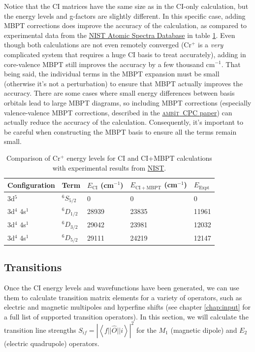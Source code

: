 \documentclass{report}
\newcommand{\ambit}{\textsc{amb}{\footnotesize i}\textsc{t}}
\begin{document}
Notice that the CI matrices have the same size as in the CI-only calculation, but the energy levels and
g-factors are slightly different. In this specific case, adding MBPT corrections does improve the
accuracy of the calculation, as compared to experimental data from the 
\href{https://physics.nist.gov/PhysRefData/ASD/levels_form.html}{NIST Atomic Spectra Database} in table
\ref{tab:CI_MBPT_comparison}. Even though both calculations are not even remotely converged (Cr$^+$ is a
\emph{very} complicated system that requires a huge CI basis to treat accurately), adding in
core-valence MBPT still improves the accuracy by a few thousand cm$^{-1}$. That being said, the
individual terms in the MBPT expansion must be small (otherwise it's not a perturbation) to ensure that
MBPT actually improves the accuracy. There are some cases where small energy differences between
basis orbitals lead to large MBPT diagrams, so including MBPT corrections (especially
valence-valence MBPT corrections, described in the \href{link_goes_here}{\ambit\  CPC paper}) can
actually reduce the accuracy of the calculation. Consequently, it's important to be careful when 
constructing the MBPT basis to ensure all the terms remain small.

\begin{table}
\label{tab:CI_MBPT_comparison}
\caption{Comparison of Cr$^+$ energy levels for CI and CI+MBPT calculations with experimental results
from \href{https://physics.nist.gov/PhysRefData/ASD/levels_form.html}{NIST}.}
\begin{tabular}{l  l  l  l  l}
\hline
Configuration   &Term    &$E_{\mathrm{CI}}$ (cm$^{-1}$)     &$E_{\mathrm{CI+MBPT}}$ (cm$^{-1}$)  & $E_{\mathrm{Expt}}$\\
\hline
\hline
3d$^5$  &$^6S_{5/2}$    &0  &0  &0\\
3d$^4$ 4s$^1$   &$^6D_{1/2}$    &28939  &23835  &11961\\
3d$^4$ 4s$^1$   &$^6D_{3/2}$    &29042  &23981  &12032\\
3d$^4$ 4s$^1$   &$^6D_{5/2}$    &29111  &24219  &12147\\
\hline
\end{tabular}
\end{table}


\subsection{Transitions}

Once the CI energy levels and wavefunctions have been generated, we can use them to calculate transition
matrix elements for a variety of operators, such as electric and magnetic multipoles and hyperfine
shifts (see chapter \ref{chap:input} for a full list of supported transition operators). In this 
section, we will calculate the transition line strengths $S_{if} =
\left|\left<f||\hat{O}||i\right>\right|^2$ for 
the $M_1$ (magnetic dipole) and $E_2$ (electric quadrupole) operators.
\end{document}
